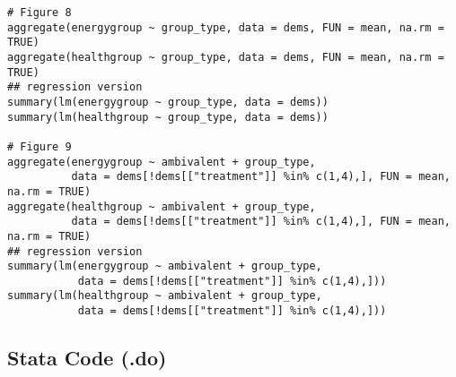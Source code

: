 \documentclass[a4paper]{exam}
\begin{document}
\begin{verbatim}
# Figure 8
aggregate(energygroup ~ group_type, data = dems, FUN = mean, na.rm = TRUE)
aggregate(healthgroup ~ group_type, data = dems, FUN = mean, na.rm = TRUE)
## regression version
summary(lm(energygroup ~ group_type, data = dems))
summary(lm(healthgroup ~ group_type, data = dems))

# Figure 9
aggregate(energygroup ~ ambivalent + group_type, 
          data = dems[!dems[["treatment"]] %in% c(1,4),], FUN = mean, na.rm = TRUE)
aggregate(healthgroup ~ ambivalent + group_type, 
          data = dems[!dems[["treatment"]] %in% c(1,4),], FUN = mean, na.rm = TRUE)
## regression version
summary(lm(energygroup ~ ambivalent + group_type, 
           data = dems[!dems[["treatment"]] %in% c(1,4),]))
summary(lm(healthgroup ~ ambivalent + group_type, 
           data = dems[!dems[["treatment"]] %in% c(1,4),]))
\end{verbatim}


\subsection*{Stata Code (.do)}
\end{document}
